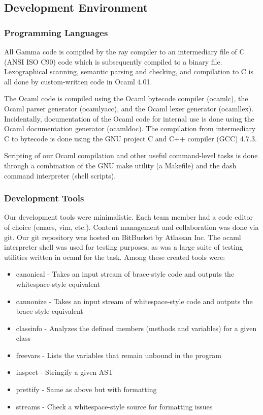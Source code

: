 \pagebreak 
\subsection{Development Environment}

\subsubsection{Programming Languages}
All Gamma code is compiled by the ray compiler to an intermediary file of C (ANSI ISO C90) code which is subsequently compiled to a binary file. Lexographical scanning, semantic parsing and checking, and compilation to C is all done by custom-written code in Ocaml 4.01.

The Ocaml code is compiled using the Ocaml bytecode compiler (ocamlc), the Ocaml parser generator (ocamlyacc), and the Ocaml lexer generator (ocamllex). Incidentally, documentation of the Ocaml code for internal use is done using the Ocaml documentation generator (ocamldoc). The compilation from intermediary C to bytecode is done using the GNU project C and C++ compiler (GCC) 4.7.3.

Scripting of our Ocaml compilation and other useful command-level tasks is done through a combination of the GNU make utility (a Makefile) and the dash command interpreter (shell scripts).

\subsubsection{Development Tools}
Our development tools were minimalistic. Each team member had a code editor of choice (emacs, vim, etc.). Content management and collaboration was done via git. Our git repository was hosted on BitBucket by Atlassan Inc. The ocaml interpreter shell was used for testing purposes, as was a large suite of testing utilities written in ocaml for the task. Among these created tools were:
\begin{itemize}
\item canonical - Takes an input stream of brace-style code and outputs the whitespace-style equivalent
\item cannonize - Takes an input stream of whitespace-style code and outputs the brace-style equivalent
\item classinfo - Analyzes the defined members (methods and variables) for a given class
\item freevars - Lists the variables that remain unbound in the program
\item inspect - Stringify a given AST
\item prettify - Same as above but with formatting
\item streams - Check a whitespace-style source for formatting issues
\end{itemize}